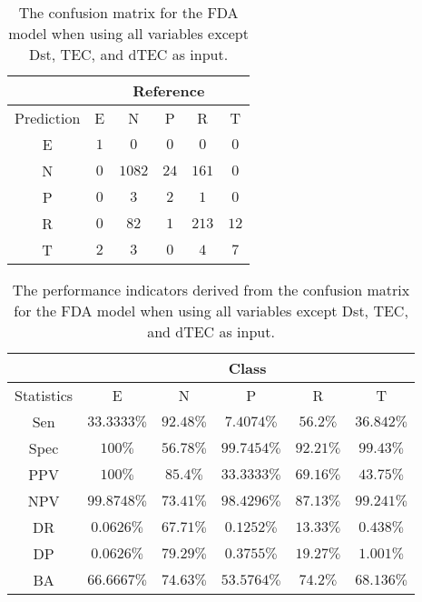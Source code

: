 \begin{table}[!ht]
	\centering
	\begin{tabular}{|c|c|c|c|c|c|}
		\hline
		 & \multicolumn{5}{|c|}{Reference} \\ \hline
		 Prediction & E & N & P & R & T \\ \hline
		 E & $1$ & $0$ & $0$ & $0$ & $0$ \\ \hline
		 N & $0$ & $1082$ & $24$ & $161$ & $0$ \\ \hline
		 P & $0$ & $3$ & $2$ & $1$ & $0$ \\ \hline
		 R & $0$ & $82$ & $1$ & $213$ & $12$ \\ \hline
		 T & $2$ & $3$ & $0$ & $4$ & $7$ \\ \hline
	\end{tabular}
	\caption{The confusion matrix for the FDA model when using all variables except Dst, TEC, and dTEC as input.}
	\label{tab:cm:noTEC:fda}
\end{table}

\begin{table}[!ht]
	\centering
	\begin{tabular}{|c|c|c|c|c|c|}
		\hline
		 & \multicolumn{5}{c|}{Class} \\ \hline
		Statistics & E & N & P & R & T \\ \hline
		Sen & $33.3333\%$ & $92.48\%$ & $7.4074\%$ & $56.2\%$ & $36.842\%$ \\ \hline
		Spec & $100\%$ & $56.78\%$ & $99.7454\%$ & $92.21\%$ & $99.43\%$ \\ \hline
		PPV & $100\%$ & $85.4\%$ & $33.3333\%$ & $69.16\%$ & $43.75\%$ \\ \hline
		NPV & $99.8748\%$ & $73.41\%$ & $98.4296\%$ & $87.13\%$ & $99.241\%$ \\ \hline
		DR & $0.0626\%$ & $67.71\%$ & $0.1252\%$ & $13.33\%$ & $0.438\%$ \\ \hline
		DP & $0.0626\%$ & $79.29\%$ & $0.3755\%$ & $19.27\%$ & $1.001\%$ \\ \hline
		BA & $66.6667\%$ & $74.63\%$ & $53.5764\%$ & $74.2\%$ & $68.136\%$ \\ \hline
	\end{tabular}
	\caption{The performance indicators derived from the confusion matrix for the FDA model when using all variables except Dst, TEC, and dTEC as input.}
	\label{tab:cs:reverse:noTEC:fda}
\end{table}

